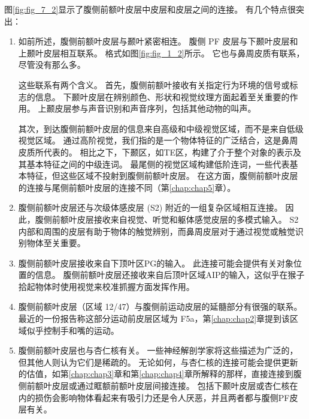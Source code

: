 图\ref{fig:fig_7_2}显示了腹侧前额叶皮层中皮层和皮层之间的连接。
有几个特点很突出：
\begin{enumerate}
\item 如前所述，腹侧前额叶皮层与颞叶紧密相连。
腹侧 PF 皮层与下颞叶皮层\cite{ungerleider1989projections,webster1994connections}和上颞叶皮层\cite{seltzer1996overlapping,petrides2002comparative}相互联系。
格式如图\ref{fig:fig_1_2}所示。
它也与鼻周皮质有联系\cite{suzuki1994perirhinal,saleem2008complementary}，尽管没有那么多。 
\par
这些联系有两个含义。
首先，腹侧前额叶接收有关指定行为环境的信号或标志的信息。
下颞叶皮层在辨别颜色、形状和视觉纹理方面起着至关重要的作用\cite{huxlin2000perceptual}。
上颞皮层参与声音识别\cite{tian2001functional}和声音序列\cite{micheyl2005perceptual}，包括其他动物的叫声\cite{rauschecker1995processing}。 
\par
其次，到达腹侧前额叶皮层的信息来自高级和中级视觉区域，而不是来自低级视觉区域。
通过高阶视觉，我们指的是一个物体特征的广泛结合，这是鼻周皮质所代表的\cite{murray2007visual}。
相比之下，下颞区，如TE区，构建了介于整个对象的表示及其基本特征之间的中级连词\cite{murray2007visual}。
最尾侧的视觉区域构建低阶连词，一些代表基本特征，但这些区域不投射到腹侧前额叶皮层\cite{webster1994connections}。
在这方面，腹侧前额叶皮层的连接与尾侧前额叶皮层的连接不同（第\ref{chap:chap5}章）。

\item 腹侧前额叶皮层还与次级体感皮层 (S2) 附近的一组复杂区域相互连接\cite{petrides2002comparative}。
因此，腹侧前额叶皮层接收来自视觉、听觉和躯体感觉皮层的多模式输入。
S2内部和周围的皮层有助于物体的触觉辨别\cite{mishkin1979analogous}，而鼻周皮层对于通过视觉或触觉识别物体至关重要\cite{goulet2001neural,murray2007visual}。

\item 腹侧前额叶皮层接收来自下顶叶区PG的输入\cite{petrides2002comparative}。
此连接可能会提供有关对象位置的信息。
腹侧前额叶皮层还接收来自后顶叶区域AIP的输入，这似乎在猴子拾起物体时使用视觉来校准抓握方面发挥作用\cite{fogassi2001cortical}。

\item 腹侧前额叶皮层（区域 12/47）与腹侧前运动皮层的延髓部分有很强的联系。 
最近的一份报告称这部分运动前皮层区域为 F5a\cite{gerbella2011cortical}，第\ref{chap:chap2}章提到该区域似乎控制手和嘴的运动。 

\item 腹侧前额叶皮层也与杏仁核有关。
一些神经解剖学家将这些描述为广泛的\cite{amaral1984amygdalo,stefanacci2002some}，但其他人则认为它们是稀疏的\cite{carmichael1995limbic,price2010neurocircuitry}。
无论如何，与杏仁核的连接可能会提供更新的估值，如第\ref{chap:chap3}章和第\ref{chap:chap4}章所解释的那样，直接连接到腹侧前额叶皮层或通过眶额前额叶皮层间接连接。
包括下颞叶皮层\cite{horel1975partial}或杏仁核\cite{horel1975partial}在内的损伤会影响物体看起来有吸引力还是令人厌恶，并且两者都与腹侧PF皮层有关。
\end{enumerate}

